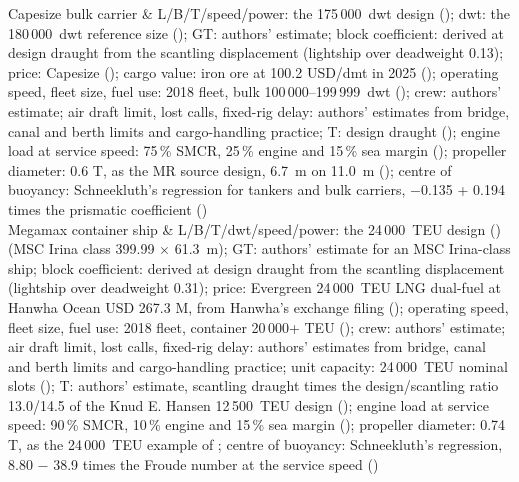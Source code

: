 Capesize bulk carrier & L/B/T/speed/power: the 175\,000~dwt design (\citealp[Table 6]{man2022bulk}); dwt: the 180\,000~dwt reference size (\citealp[p. 16]{allied2026}); GT: authors' estimate; block coefficient: derived at design draught from the scantling displacement (lightship over deadweight 0.13); price: Capesize (\citealp[p. 7]{allied2026}); cargo value: iron ore at 100.2 USD/dmt in 2025 (\citealp{worldbank2026}); operating speed, fleet size, fuel use: 2018 fleet, bulk 100\,000--199\,999~dwt (\citealp[Table 35]{faber2020}); crew: authors' estimate; air draft limit, lost calls, fixed-rig delay: authors' estimates from bridge, canal and berth limits and cargo-handling practice; T: design draught (\citealp[Table 6]{man2022bulk}); engine load at service speed: 75\,\% SMCR, 25\,\% engine and 15\,\% sea margin (\citealp[Table 6]{man2022bulk}); propeller diameter: 0.6 T, as the MR source design, 6.7~m on 11.0~m (\citealp[Tables 1-2]{man2019mr}); centre of buoyancy: Schneekluth's regression for tankers and bulk carriers, \ensuremath{-}0.135 + 0.194 times the prismatic coefficient (\citealp[slide 16]{ventura_estimation}) \\
Megamax container ship & L/B/T/dwt/speed/power: the 24\,000~TEU design (\citealp[Table 19]{man2024container}) (MSC Irina class 399.99 \ensuremath{\times} 61.3~m); GT: authors' estimate for an MSC Irina-class ship; block coefficient: derived at design draught from the scantling displacement (lightship over deadweight 0.31); price: Evergreen 24\,000~TEU LNG dual-fuel at Hanwha Ocean USD 267.3 M, from Hanwha's exchange filing (\citealp{indiaseatrade2025evergreen}); operating speed, fleet size, fuel use: 2018 fleet, container 20\,000+ TEU (\citealp[Table 35]{faber2020}); crew: authors' estimate; air draft limit, lost calls, fixed-rig delay: authors' estimates from bridge, canal and berth limits and cargo-handling practice; unit capacity: 24\,000~TEU nominal slots (\citealp[Table 19]{man2024container}); T: authors' estimate, scantling draught times the design/scantling ratio 13.0/14.5 of the Knud E. Hansen 12\,500~TEU design (\citealp{keh_12500teu}); engine load at service speed: 90\,\% SMCR, 10\,\% engine and 15\,\% sea margin (\citealp[Table 19]{man2024container}); propeller diameter: 0.74 T, as the 24\,000~TEU example of \citet{man2011}; centre of buoyancy: Schneekluth's regression, 8.80 \ensuremath{-} 38.9 times the Froude number at the service speed (\citealp[slide 16]{ventura_estimation}) \\
